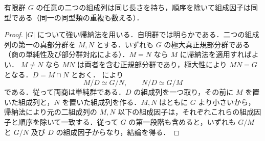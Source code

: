 \begin{prop}
有限群 $G$ の任意の二つの組成列は同じ長さを持ち，順序を除いて組成因子は同型である（同一の同型類の重複も数える）．
\end{prop}
\begin{proof}
$|G|$ について強い帰納法を用いる．自明群では明らかである．二つの組成列の第一の真部分群を $M,N$ とする．いずれも $G$ の極大真正規部分群である（商の単純性及び部分群対応による）．$M=N$ なら $M$ に帰納法を適用すればよい．
$M\ne N$ なら $MN$ は両者を含む正規部分群であり，極大性により $MN=G$ となる．$D=M\cap N$ とおく． により
\[
 M/D\simeq G/N,\qquad N/D\simeq G/M
\]
である．従って両商は単純群である．$D$ の組成列を一つ取り，その前に $M$ を置いた組成列と，$N$ を置いた組成列を作る．$M,N$ はともに $G$ より小さいから，帰納法により元の二組成列の $M,N$ 以下の組成因子は，それぞれこれらの組成因子と順序を除いて一致する．従って $G$ の第一段階も含めると，いずれも $G/M$ と $G/N$ 及び $D$ の組成因子からなり，結論を得る．
\end{proof}
